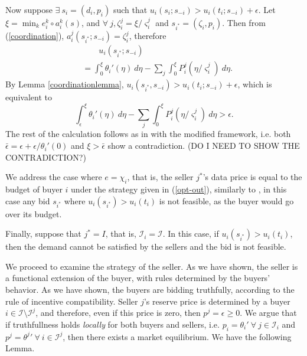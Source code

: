 \documentclass[12pt]{article}
\theoremstyle{definition}
\newcommand{\vs}{\varsigma}
\newcommand{\mcI}{\mathcal{I}}
\begin{document}
\begin{multicols}{2}
Now suppose $\exists \ s_i = (d_i, p_i)$ such that $u_i(s_i;s_{-i}) > u_i(t_i;
s_{-i}) + \epsilon$. Let $\xi = \min_k e_i^k\circ a_i^k(s)$, and $\forall \ j,
\zeta_i^j = \xi/\vs_i^j$ and $s_{i^*} = (\zeta_i,p_i)$. Then from
(\ref{coordination}), $a_i^j(s_{i^*}; s_{-i}) = \zeta_i^j$, therefore
\begin{align*}
    &\qquad u_i(s_{i^*};s_{-i}) \\
    &= \displaystyle\int_0^\xi {\theta_i}'(\eta)\ d\eta -\sum_j\int_0^\xi P_i^j(\eta/\vs_i^j) \ d\eta.
\end{align*}
By Lemma \ref{coordinationlemma}, $u_i(s_{i^*}, s_{-i}) > u_i(t_i; s_{-i}) +
\epsilon$, which is equivalent to 
$$
    \int_\epsilon^\xi {\theta_i}'(\eta) \ d\eta - \sum_j\int_0^\xi
P_i^j(\eta/\vs_i^j) \ d\eta > \epsilon.
$$
The rest of the calculation follows as in \cite{semret} with the modified
framework, i.e. both $\bar\epsilon = \epsilon + \epsilon/{\theta_i}'(0)$ and
$\xi > \bar\epsilon$ show a contradiction.
(DO I NEED TO SHOW THE CONTRADICTION?)

We address the case where $e=\chi_i$, that is, the seller $j^*$'s data price is
equal to the budget of buyer $i$ under the strategy given in
(\ref{opt-out}), similarly to \cite{semret}, in this case any bid $s_{i^*}$
where $u_i(s_{i^*}) > u_i(t_i)$ is not feasible, as the buyer would go over its
budget.

Finally, suppose that $j^* = I$, that is, $\mcI_i = \mcI$. 
In this case, if $u_i(s_{i^*}) > u_i(t_i)$, then
the demand cannot be satisfied by the sellers and the bid is not feasible. 

We proceed to examine the strategy of the seller. As we have shown, the seller
is a functional extension of the buyer, with rules determined by the buyers'
behavior. As we have shown, the buyers are bidding truthfully, according to the
rule of incentive compatibility. Seller $j$'s reserve price is determined by a
buyer $i \in \mcI \setminus \mcI^j$, and therefore, even if this price is zero,
then $p^j = \epsilon \ge 0$.
We argue that if truthfullness holds \emph{locally} for both buyers and sellers, i.e. $p_i ={\theta_i}' \
\forall \ j \in \mcI_i$ and $p^j = {\theta^j}' \ \forall \ i \in\mcI^j$, then there exists a market
equilibrium. We have the following Lemma.


\end{multicols}
\end{document}
